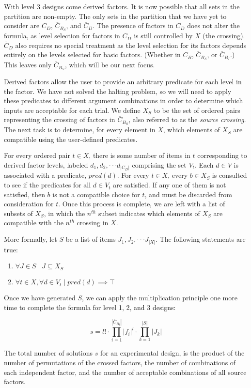 With level 3 designs come derived factors. It is now possible that all sets in the partition are non-empty. The only sets in the partition that we have yet to consider are $C_D$, $\overline{C}_{B_S}$, and $\overline{C}_D$. The presence of factors in $C_D$ does not alter the formula, as level selection for factors in $C_D$ is still controlled by $X$ (the crossing). $\overline{C}_D$ also requires no special treatment as the level selection for its factors depends entirely on the levels selected for basic factors. (Whether in $C_B$, $\overline{C}_{B_S}$, or $\overline{C}_{B_I}$.) This leaves only $\overline{C}_{B_S}$, which will be our next focus.

Derived factors allow the user to provide an arbitrary predicate for each level in the factor. We have not solved the halting problem, so we will need to apply these predicates to different argument combinations in order to determine which inputs are acceptable for each trial. We define $X_S$ to be the set of ordered pairs representing the crossing of factors in $\overline{C}_{B_S}$, also referred to as the \textit{source crossing}. The next task is to determine, for every element in $X$, which elements of $X_S$ are compatible using the user-defined predicates.

For every ordered pair $t \in X$, there is some number of items in $t$ corresponding to derived factor levels, labeled $d_1, d_2, \cdot\cdot\cdot d_{|C_D|}$ comprising the set $V_t$. Each $d \in V$ is associated with a predicate, $pred(d)$. For every $t \in X$, every $b \in X_S$ is consulted to see if the predicates for all $d \in V_t$ are satisfied. If any one of them is not satisfied, then $b$ is not a compatible choice for $t$, and must be discarded from consideration for $t$. Once this process is complete, we are left with a list of subsets of $X_S$, in which the $n^{th}$ subset indicates which elements of $X_S$ are compatible with the $n^{th}$ crossing in $X$.

More formally, let $S$ be a list of items $J_1, J_2, \cdot\cdot\cdot J_{|X|}$. The following statements are true:

\begin{enumerate}
\item $\forall J \in S \mid J \subseteq X_S$
\item $\forall t \in X,  \forall d \in V_t \mid pred(d) \implies \top$
\end{enumerate}

Once we have generated $S$, we can apply the multiplication principle one more time to complete the formula for level 1, 2, and 3 designs:

\[
s = l! \cdot \prod_{i=1}^{|\overline{C}_{B_I}|} |f_i|^l \cdot \prod_{k=1}^{|S|} |J_k|
\]

The total number of solutions $s$ for an experimental design, is the product of the number of permutations of the crossed factors, the number of combinations of each independent factor, and the number of acceptable combinations of all source factors.


